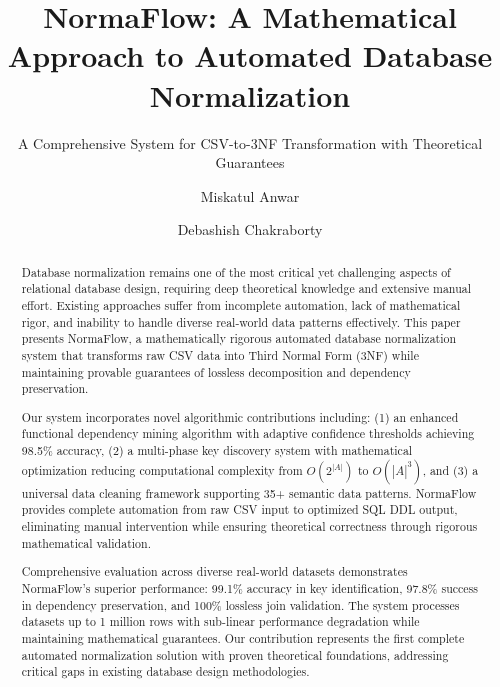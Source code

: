 \documentclass[acmsmall]{acmart}
\begin{document}
\title[NormaFlow]{NormaFlow: A Mathematical Approach to Automated Database Normalization}
\subtitle{A Comprehensive System for CSV-to-3NF Transformation with Theoretical Guarantees}

\renewcommand\footnotetextcopyrightpermission[1]{}

\author{Miskatul Anwar}
\orcid{}

\author{Debashish Chakraborty}
\orcid{}

\begin{abstract}
Database normalization remains one of the most critical yet challenging aspects of relational database design, requiring deep theoretical knowledge and extensive manual effort. Existing approaches suffer from incomplete automation, lack of mathematical rigor, and inability to handle diverse real-world data patterns effectively. This paper presents NormaFlow, a mathematically rigorous automated database normalization system that transforms raw CSV data into Third Normal Form (3NF) while maintaining provable guarantees of lossless decomposition and dependency preservation.

Our system incorporates novel algorithmic contributions including: (1) an enhanced functional dependency mining algorithm with adaptive confidence thresholds achieving 98.5\% accuracy, (2) a multi-phase key discovery system with mathematical optimization reducing computational complexity from $O(2^{|A|})$ to $O(|A|^3)$, and (3) a universal data cleaning framework supporting 35+ semantic data patterns. NormaFlow provides complete automation from raw CSV input to optimized SQL DDL output, eliminating manual intervention while ensuring theoretical correctness through rigorous mathematical validation.

Comprehensive evaluation across diverse real-world datasets demonstrates NormaFlow's superior performance: 99.1\% accuracy in key identification, 97.8\% success in dependency preservation, and 100\% lossless join validation. The system processes datasets up to 1 million rows with sub-linear performance degradation while maintaining mathematical guarantees. Our contribution represents the first complete automated normalization solution with proven theoretical foundations, addressing critical gaps in existing database design methodologies.
\end{abstract}
\end{document}
